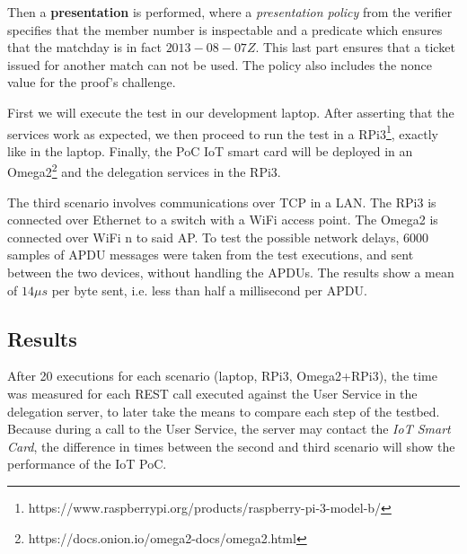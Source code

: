 Then a \textbf{presentation} is performed, where a \textit{presentation policy} from the verifier specifies that the member number is inspectable and a predicate which ensures that the matchday is in fact $2013-08-07Z$. This last part ensures that a ticket issued for another match can not be used. The policy also includes the nonce value for the proof's challenge.

\hfil


First we will execute the test in our development laptop. After asserting that the services work as expected, we then proceed to run the test in a RPi3\footnote{{https://www.raspberrypi.org/products/raspberry-pi-3-model-b/}}, exactly like in the laptop. Finally, the PoC IoT smart card will be deployed in an Omega2\footnote{{https://docs.onion.io/omega2-docs/omega2.html}} and the delegation services in the RPi3.

\hfil

The third scenario involves communications over TCP in a LAN. The RPi3 is connected over Ethernet to a switch with a WiFi access point. The Omega2 is connected over WiFi n to said AP. To test the possible network delays, $6000$ samples of APDU messages were taken from the test executions, and sent between the two devices, without handling the APDUs. The results show a mean of $14\mu s$ per byte sent, i.e. less than half a millisecond per APDU.



\subsection{Results}

After 20 executions for each scenario (laptop, RPi3, Omega2+RPi3), the time was measured for each REST call executed against the User Service in the delegation server, to later take the means to compare each step of the testbed. Because during a call to the User Service, the server may contact the \textit{IoT Smart Card}, the difference in times between the second and third scenario will show the performance of the IoT PoC.

